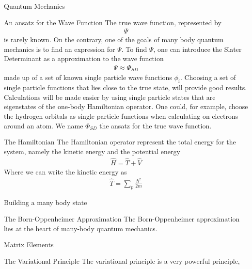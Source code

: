 \documentclass[twoside,english]{uiofysmaster}
\begin{document}
\begin{chapter}{Quantum Mechanics}
	\begin{section}{An ansatz for the Wave Function}
		The true wave function, represented by
		\begin{align}
			\Psi
		\end{align}
		is rarely known. On the contrary, one of the goals of many body quantum mechanics is to find an expression for $\Psi $. To find $\Psi$, one can introduce the Slater Determinant as a approximation to the wave function 
		\begin{align}
			\Psi \approx \Phi_{SD}
		\end{align}
		made up of a set of known single particle wave functions $\phi_i$. Choosing a set of single particle functions that lies close to the true state, will provide good results. Calculations will be made easier by using single particle states that are eigenstates of the one-body Hamiltonian operator. One could, for example, choose the hydrogen orbitals as single particle functions when calculating on electrons around an atom. We name $\Phi_{SD}$ the ansatz for the true wave function. 
	\end{section}

 	\begin{section}{The Hamiltonian}
 		The Hamiltonian operator represent the total energy for the system, namely the kinetic energy and the potential energy
 		\begin{align}
 			\hat H = \hat T + \hat V
 		\end{align}
 		Where we can write the kinetic energy as
 		\begin{align}
 			\hat T = \sum_p \frac{\hbar^2}{2m} 
 		\end{align}
 	\end{section}

	\begin{section}{Building a many body state}
		
	\end{section}

 	\begin{section}{The Born-Oppenheimer Approximation}
 		The Born-Oppenheimer approximation lies at the heart of many-body quantum mechanics. 
 	\end{section}

	\begin{section}{Matrix Elements}
		
	\end{section}

	\begin{section}{The Variational Principle}
		The variational principle is a very powerful principle, 
	\end{section}

\end{chapter}
\end{document}
